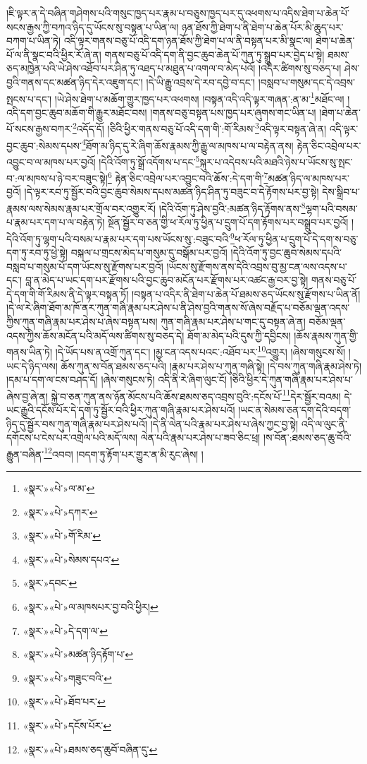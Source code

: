 །ཇི་ལྟར་ན་དེ་བཞིན་གཤེགས་པའི་གསུང་ཁྱད་པར་རྣམ་པ་བཅུས་ཁྱད་པར་དུ་འཕགས་པ་འདིས་ཐེག་པ་ཆེན་པོ་སངས་རྒྱས་ཀྱི་བཀའ་ཉིད་དུ་ཡོངས་སུ་བསྟན་པ་ཡིན་ལ། ཉན་ཐོས་ཀྱི་ཐེག་པ་ནི་ཐེག་པ་ཆེན་པོར་མི་ཆུད་པར་བཀག་པ་ཡིན་ཏེ། འདི་ལྟར་གནས་བཅུ་པོ་འདི་དག་ཉན་ཐོས་ཀྱི་ཐེག་པ་ལ་ནི་བསྟན་པར་མི་སྣང་ལ། ཐེག་པ་ཆེན་པོ་ལ་ནི་སྣང་བའི་ཕྱིར་རོ་ཞེ་ན། གནས་བཅུ་པོ་འདི་དག་ནི་བྱང་ཆུབ་ཆེན་པོ་ཀུན་ཏུ་སྒྲུབ་པར་བྱེད་པ་སྟེ། ཐམས་ཅད་མཁྱེན་པའི་ཡེ་ཤེས་འཐོབ་པར་ཤིན་ཏུ་འཐད་པ་མཐུན་པ་འགལ་བ་མེད་པའོ། །འདིར་ཚིགས་སུ་བཅད་པ། ཤེས་བྱའི་གནས་དང་མཚན་ཉིད་དེར་འཇུག་དང་། །དེ་ཡི་རྒྱུ་འབྲས་དེ་རབ་དབྱེ་བ་དང་། །བསླབ་པ་གསུམ་དང་དེ་འབྲས་སྤངས་པ་དང་། །ཡེ་ཤེས་ཐེག་པ་མཆོག་གྱུར་ཁྱད་པར་འཕགས། །བསྟན་འདི་འདི་ལྟར་གཞན་:ན་མ་\footnote{«སྣར་»«པེ་»ལ་མ་}མཐོང་ལ། །འདི་དག་བྱང་ཆུབ་མཆོག་གི་རྒྱུར་མཐོང་བས། །གནས་བཅུ་བསྟན་པས་ཁྱད་པར་ཞུགས་གང་ཡིན་པ། །ཐེག་པ་ཆེན་པོ་སངས་རྒྱས་བཀར་\footnote{«སྣར་»«པེ་»དཀར་}འདོད་དོ། །ཅིའི་ཕྱིར་གནས་བཅུ་པོ་འདི་དག་གི་:གོ་རིམས་\footnote{«སྣར་»«པེ་»གོ་རིམ་}འདི་ལྟར་བསྟན་ཞེ་ན། འདི་ལྟར་བྱང་ཆུབ་:སེམས་དཔས་\footnote{«སྣར་»«པེ་»སེམས་དཔའ་}ཐོག་མ་ཉིད་དུ་རེ་ཞིག་ཆོས་རྣམས་ཀྱི་རྒྱུ་ལ་མཁས་པ་ལ་བརྟེན་ནས། རྟེན་ཅིང་འབྲེལ་པར་འབྱུང་བ་ལ་མཁས་པར་བྱའོ། །དེའི་འོག་ཏུ་སྒྲོ་འདོགས་པ་དང་\footnote{«སྣར་»དབང་}སྐུར་པ་འདེབས་པའི་མཐའི་ཉེས་པ་ཡོངས་སུ་སྤང་བ་:ལ་མཁས་པ་ཉེ་བར་བཟུང་སྟེ།\footnote{«སྣར་»«པེ་»ལ་མཁསཔར་བྱ་བའི་ཕྱིར།} རྟེན་ཅིང་འབྲེལ་པར་འབྱུང་བའི་ཆོས་:དེ་དག་གི་\footnote{«སྣར་»«པེ་»དེ་དག་ལ་}མཚན་ཉིད་ལ་མཁས་པར་བྱའོ། །དེ་ལྟར་རབ་ཏུ་སྦྱོར་བའི་བྱང་ཆུབ་སེམས་དཔས་མཚན་ཉིད་ཤིན་ཏུ་བཟུང་བ་དེ་རྟོགས་པར་བྱ་སྟེ། དེས་སྒྲིབ་པ་རྣམས་ལས་སེམས་རྣམ་པར་གྲོལ་བར་འགྱུར་རོ། །དེའི་འོག་ཏུ་ཤེས་བྱའི་:མཚན་ཉིད་རྟོགས་ནས་\footnote{«སྣར་»«པེ་»མཚན་ཉིདརྟོག་པ་}ལྷག་པའི་བསམ་པ་རྣམ་པར་དག་པ་ལ་བརྟེན་ཏེ། སྔོན་སྦྱོར་བ་ཅན་གྱི་ཕ་རོལ་ཏུ་ཕྱིན་པ་དྲུག་པོ་དག་རྟོགས་པར་བསྒྲུབ་པར་བྱའོ། །དེའི་འོག་ཏུ་ལྷག་པའི་བསམ་པ་རྣམ་པར་དག་པས་ཡོངས་སུ་:བཟུང་བའི་\footnote{«སྣར་»«པེ་»གཟུང་བའི་}ཕ་རོལ་ཏུ་ཕྱིན་པ་དྲུག་པོ་དེ་དག་ས་བཅུ་དག་ཏུ་རབ་ཏུ་ཕྱེ་སྟེ། བསྐལ་པ་གྲངས་མེད་པ་གསུམ་དུ་བསྒོམ་པར་བྱའོ། །དེའི་འོག་ཏུ་བྱང་ཆུབ་སེམས་དཔའི་བསླབ་པ་གསུམ་པོ་དག་ཡོངས་སུ་རྫོགས་པར་བྱའོ། །ཡོངས་སུ་རྫོགས་ནས་དེའི་འབྲས་བུ་མྱ་ངན་ལས་འདས་པ་དང་། བླ་ན་མེད་པ་ཡང་དག་པར་རྫོགས་པའི་བྱང་ཆུབ་མངོན་པར་རྫོགས་པར་འཚང་རྒྱ་བར་བྱ་སྟེ། གནས་བཅུ་པོ་དེ་དག་གི་གོ་རིམས་ནི་དེ་ལྟར་བསྟན་ཏོ། །བསྟན་པ་འདིར་ནི་ཐེག་པ་ཆེན་པོ་ཐམས་ཅད་ཡོངས་སུ་རྫོགས་པ་ཡིན་ནོ། །དེ་ལ་རེ་ཞིག་ཐོག་མ་ཁོ་ནར་ཀུན་གཞི་རྣམ་པར་ཤེས་པ་ནི་ཤེས་བྱའི་གནས་སོ་ཞེས་བརྗོད་པ་བཅོམ་ལྡན་འདས་ཀྱིས་ཀུན་གཞི་རྣམ་པར་ཤེས་པ་ཞེས་བསྟན་པས། ཀུན་གཞི་རྣམ་པར་ཤེས་པ་གང་དུ་བསྟན་ཞེ་ན། བཅོམ་ལྡན་འདས་ཀྱིས་ཆོས་མངོན་པའི་མདོ་ལས་ཚིགས་སུ་བཅད་དེ། ཐོག་མ་མེད་པའི་དུས་ཀྱི་དབྱིངས། །ཆོས་རྣམས་ཀུན་གྱི་གནས་ཡིན་ཏེ། །དེ་ཡོད་པས་ན་འགྲོ་ཀུན་དང་། །མྱ་ངན་འདས་པའང་:འཐོབ་པར་\footnote{«སྣར་»«པེ་»ཐོབ་པར་}འགྱུར། །ཞེས་གསུངས་སོ། །ཡང་དེ་ཉིད་ལས། ཆོས་ཀུན་ས་བོན་ཐམས་ཅད་པའི། །རྣམ་པར་ཤེས་པ་ཀུན་གཞི་སྟེ། །དེ་བས་ཀུན་གཞི་རྣམ་ཤེས་ཏེ། །དམ་པ་དག་ལ་ངས་བཤད་དོ། །ཞེས་གསུངས་ཏེ། འདི་ནི་རེ་ཞིག་ལུང་ངོ། །ཅིའི་ཕྱིར་དེ་ཀུན་གཞི་རྣམ་པར་ཤེས་པ་ཞེས་བྱ་ཞེ་ན། སྐྱེ་བ་ཅན་ཀུན་ནས་ཉོན་མོངས་པའི་ཆོས་ཐམས་ཅད་འབྲས་བུའི་:དངོས་པོ་\footnote{«སྣར་»«པེ་»དངོས་པོར་}དེར་སྦྱོར་བའམ། དེ་ཡང་རྒྱུའི་དངོས་པོར་དེ་དག་ཏུ་སྦྱོར་བའི་ཕྱིར་ཀུན་གཞི་རྣམ་པར་ཤེས་པའོ། །ཡང་ན་སེམས་ཅན་དག་དེའི་བདག་ཉིད་དུ་སྦྱོར་བས་ཀུན་གཞི་རྣམ་པར་ཤེས་པའོ། །དེ་ནི་ལེན་པའི་རྣམ་པར་ཤེས་པ་ཞེས་ཀྱང་བྱ་སྟེ། འདི་ལ་ལུང་ནི་དགོངས་པ་ངེས་པར་འགྲེལ་པའི་མདོ་ལས། ལེན་པའི་རྣམ་པར་ཤེས་པ་ཟབ་ཅིང་ཕྲ། །ས་བོན་:ཐམས་ཅད་ཆུ་བོའི་རྒྱུན་བཞིན་\footnote{«སྣར་»«པེ་»ཐམས་ཅད་ཆུབོ་བཞིན་དུ་}འབབ། །བདག་ཏུ་རྟོག་པར་གྱུར་ན་མི་རུང་ཞེས། །
